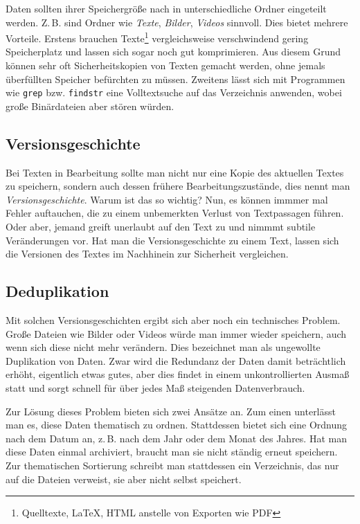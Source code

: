 \documentclass[a4paper,11pt,fleqn,twocolumn,twoside]{scrartcl}
\begin{document}
Daten sollten ihrer Speichergröße nach in unterschiedliche Ordner
eingeteilt werden. Z.\,B. sind Ordner wie \emph{Texte}, \emph{Bilder},
\emph{Videos} sinnvoll. Dies bietet mehrere Vorteile. Erstens brauchen
Texte\footnote{Quelltexte, LaTeX, HTML anstelle von Exporten wie PDF}
vergleichsweise verschwindend gering Speicherplatz und lassen
sich sogar noch gut komprimieren. Aus diesem Grund können sehr oft
Sicherheitskopien von Texten gemacht werden, ohne jemals
überfüllten Speicher befürchten zu müssen. Zweitens lässt sich mit
Programmen wie \texttt{grep} bzw. \texttt{findstr} eine Volltextsuche
auf das Verzeichnis anwenden, wobei große Binärdateien aber stören
würden.

\subsection{Versionsgeschichte}

Bei Texten in Bearbeitung sollte man nicht nur eine Kopie
des aktuellen Textes zu speichern, sondern auch dessen frühere
Bearbeitungszustände, dies nennt man
\emph{Versionsgeschichte}. Warum ist das so wichtig?
Nun, es können immmer mal Fehler auftauchen, die zu einem
unbemerkten Verlust von Textpassagen führen. Oder aber, jemand
greift unerlaubt auf den Text zu und nimmmt subtile Veränderungen
vor. Hat man die Versionsgeschichte zu einem Text, lassen sich
die Versionen des Textes im Nachhinein zur Sicherheit vergleichen.

\subsection{Deduplikation}

Mit solchen Versionsgeschichten ergibt sich aber noch ein technisches
Problem. Große Dateien wie Bilder oder Videos würde man immer
wieder speichern, auch wenn sich diese nicht mehr verändern.
Dies bezeichnet man als ungewollte Duplikation von Daten.
Zwar wird die Redundanz der Daten damit beträchtlich erhöht,
eigentlich etwas gutes, aber dies findet in einem unkontrollierten
Ausmaß statt und sorgt schnell für über jedes Maß
steigenden Datenverbrauch.

Zur Lösung dieses Problem bieten sich zwei Ansätze an.
Zum einen unterlässt man es, diese Daten thematisch zu ordnen.
Stattdessen bietet sich eine Ordnung nach dem Datum an, z.\,B.
nach dem Jahr oder dem Monat des Jahres. Hat man diese Daten
einmal archiviert, braucht man sie nicht ständig erneut speichern.
Zur thematischen Sortierung schreibt man stattdessen ein Verzeichnis,
das nur auf die Dateien verweist, sie aber nicht selbst speichert.
\end{document}
